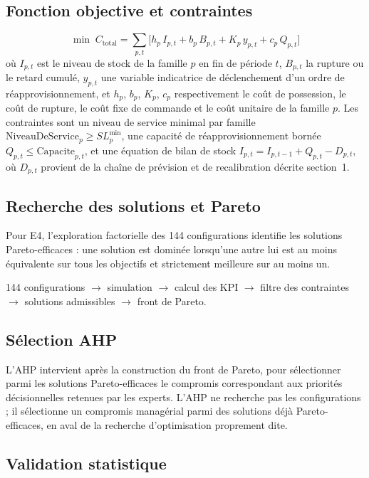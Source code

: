\documentclass[11pt,a4paper]{article}
\begin{document}
\subsection{Fonction objective et contraintes}

\[
\min\; C_{\text{total}} = \sum_{p,t} \Big[ h_p\, I_{p,t} + b_p\, B_{p,t} + K_p\, y_{p,t} + c_p\, Q_{p,t} \Big]
\]
où $I_{p,t}$ est le niveau de stock de la famille $p$ en fin de période $t$, $B_{p,t}$ la rupture ou le retard cumulé, $y_{p,t}$ une variable indicatrice de déclenchement d'un ordre de réapprovisionnement, et $h_p$, $b_p$, $K_p$, $c_p$ respectivement le coût de possession, le coût de rupture, le coût fixe de commande et le coût unitaire de la famille $p$. Les contraintes sont un niveau de service minimal par famille $\text{NiveauDeService}_p \geq SL_p^{\min}$, une capacité de réapprovisionnement bornée $Q_{p,t} \leq \text{Capacite}_{p,t}$, et une équation de bilan de stock $I_{p,t} = I_{p,t-1} + Q_{p,t} - D_{p,t}$, où $D_{p,t}$ provient de la chaîne de prévision et de recalibration décrite section~1.

\subsection{Recherche des solutions et Pareto}

Pour E4, l'exploration factorielle des 144 configurations identifie les solutions Pareto-efficaces : une solution est dominée lorsqu'une autre lui est au moins équivalente sur tous les objectifs et strictement meilleure sur au moins un.
\begin{center}
\small
144 configurations $\to$ simulation $\to$ calcul des KPI $\to$ filtre des contraintes $\to$ solutions admissibles $\to$ front de Pareto.
\end{center}

\subsection{Sélection AHP}

L'AHP intervient après la construction du front de Pareto, pour sélectionner parmi les solutions Pareto-efficaces le compromis correspondant aux priorités décisionnelles retenues par les experts. L'AHP ne recherche pas les configurations ; il sélectionne un compromis managérial parmi des solutions déjà Pareto-efficaces, en aval de la recherche d'optimisation proprement dite.

\subsection{Validation statistique}
\end{document}
